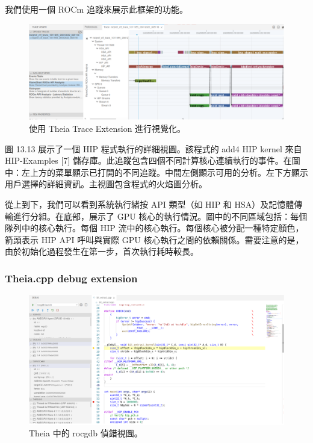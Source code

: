 我們使用一個 ROCm 追蹤來展示此框架的功能。

\begin{figure}
    \centering
    \includegraphics[width=0.9\linewidth]{FileAusiliari/Screenshots/Figure13-13.png}
    \caption{使用 Theia Trace Extension 進行視覺化。}
    \label{fig:PAPI13}
\end{figure}

圖 13.13 展示了一個 HIP 程式執行的詳細視圖。該程式的 add4 HIP kernel 來自 HIP-Examples [7] 儲存庫。此追蹤包含四個不同計算核心連續執行的事件。在圖中：左上方的菜單顯示已打開的不同追蹤。中間左側顯示可用的分析。左下方顯示用戶選擇的詳細資訊。主視圖包含程式的火焰圖分析。

從上到下，我們可以看到系統執行緒按 API 類型（如 HIP 和 HSA）及記憶體傳輸進行分組。在底部，展示了 GPU 核心的執行情況。圖中的不同區域包括：每個隊列中的核心執行。每個 HIP 流中的核心執行。每個核心被分配一種特定顏色，箭頭表示 HIP API 呼叫與實際 GPU 核心執行之間的依賴關係。需要注意的是，由於初始化過程發生在第一步，首次執行耗時較長。


\subsubsection{Theia.cpp debug extension}

\begin{figure}
    \centering
    \includegraphics[width=0.9\linewidth]{FileAusiliari/Screenshots/Figure13-14.png}
    \caption{Theia 中的 rocgdb 偵錯視圖。}
    \label{fig:PAPI14}
\end{figure}

